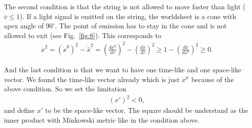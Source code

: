 The second condition is that the string is not allowed to move faster than light ($\bar{v} \leq 1$). If a light signal is emitted on the string, the worldsheet is a cone with apex angle of $90^{\circ}$. The point of emission has to stay in the cone and is not allowed to exit (see Fig.~\ref{fig:8}). This corresponds to
\begin{align}
\dot{x}^2 = (\dot{x}^0)^2 - \dot{\bar{x}}^2 = \left( \frac{dx^0}{d\tau} \right)^2 - \left( \frac{d\bar{x}}{d\tau} \right)^2 \geq 1 - \left( \frac{d\bar{x}}{dx^0} \right)^2 \geq 0.
\end{align}

\pagebreak

And the last condition is that we want to have one time-like and one space-like vector. We found the time-like vector already which is just $\dot{x}^{\mu}$ because of the above condition. So we set the limitation 
\begin{align}
(x')^2 < 0,
\end{align}
and define $x'$ to be the space-like vector. The square should be understand as the inner product with Minkowski metric like in the condition above.



